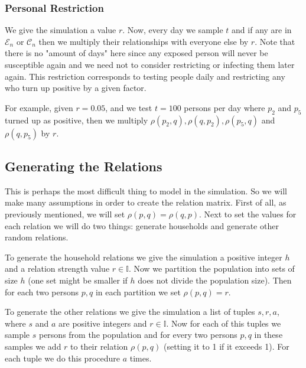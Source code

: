 \documentclass{article}
\newcommand*{\uniti}{\mathbb{I}}
\newcommand*{\mce}{\mathcal{E}}
\newcommand*{\mcc}{\mathcal{C}}
\begin{document}
\subsubsection{Personal Restriction}
We give the simulation a value \(r\). Now, every day we sample \(t\) and if any are in \(\mce_n\) or \(\mcc_n\) then we multiply their relationships with everyone else by \(r\). Note that there is no "amount of days" here since any exposed person will never be susceptible again and we need not to consider restricting or infecting them later again. This restriction corresponds to testing people daily and restricting any who turn up positive by a given factor.

For example, given \(r=0.05\), and we test \(t=100\) persons per day where \(p_2\) and \(p_5\) turned up as positive, then we multiply \(\rho(p_2, q), \rho(q, p_2), \rho(p_5, q)\) and \(\rho(q, p_5)\) by \(r\).

\subsection{Generating the Relations}
This is perhaps the most difficult thing to model in the simulation. So we will make many assumptions in order to create the relation matrix.
First of all, as previously mentioned, we will set \(\rho(p, q) = \rho(q, p)\). Next to set the values for each relation we will do two things: generate households and generate other random relations.

To generate the household relations we give the simulation a positive integer \(h\) and a relation strength value \(r \in \uniti\). Now we partition the population into sets of size \(h\) (one set might be smaller if \(h\) does not divide the population size). Then for each two persons \(p, q\) in each partition we set \(\rho(p, q) = r\).

To generate the other relations we give the simulation a list of tuples \(s,r,a\), where \(s\) and \(a\) are positive integers and \(r \in \uniti\). Now for each of this tuples we sample \(s\) persons from the population and for every two persons \(p, q\) in these samples we add \(r\) to their relation \(\rho(p, q)\) (setting it to 1 if it exceeds 1). For each tuple we do this procedure \(a\) times.
\end{document}
